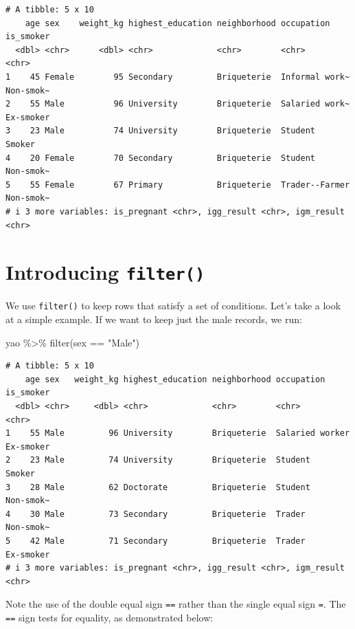 \documentclass[
  letterpaper,
  DIV=11,
  numbers=noendperiod]{scrreprt}
\newenvironment{Shaded}{\begin{snugshade}}{\end{snugshade}}
\newcommand{\FunctionTok}[1]{\textcolor[rgb]{0.28,0.35,0.67}{#1}}
\newcommand{\NormalTok}[1]{\textcolor[rgb]{0.00,0.23,0.31}{#1}}
\newcommand{\SpecialCharTok}[1]{\textcolor[rgb]{0.37,0.37,0.37}{#1}}
\newcommand{\StringTok}[1]{\textcolor[rgb]{0.13,0.47,0.30}{#1}}
\begin{document}
\begin{verbatim}
# A tibble: 5 x 10
    age sex    weight_kg highest_education neighborhood occupation     is_smoker
  <dbl> <chr>      <dbl> <chr>             <chr>        <chr>          <chr>    
1    45 Female        95 Secondary         Briqueterie  Informal work~ Non-smok~
2    55 Male          96 University        Briqueterie  Salaried work~ Ex-smoker
3    23 Male          74 University        Briqueterie  Student        Smoker   
4    20 Female        70 Secondary         Briqueterie  Student        Non-smok~
5    55 Female        67 Primary           Briqueterie  Trader--Farmer Non-smok~
# i 3 more variables: is_pregnant <chr>, igg_result <chr>, igm_result <chr>
\end{verbatim}

\section{\texorpdfstring{Introducing
\texttt{filter()}}{Introducing filter()}}\label{introducing-filter}

We use \texttt{filter()} to keep rows that satisfy a set of conditions.
Let's take a look at a simple example. If we want to keep just the male
records, we run:

\begin{Shaded}
\begin{Highlighting}[]
\NormalTok{yao }\SpecialCharTok{\%\textgreater{}\%} \FunctionTok{filter}\NormalTok{(sex }\SpecialCharTok{==} \StringTok{"Male"}\NormalTok{)}
\end{Highlighting}
\end{Shaded}

\begin{verbatim}
# A tibble: 5 x 10
    age sex   weight_kg highest_education neighborhood occupation      is_smoker
  <dbl> <chr>     <dbl> <chr>             <chr>        <chr>           <chr>    
1    55 Male         96 University        Briqueterie  Salaried worker Ex-smoker
2    23 Male         74 University        Briqueterie  Student         Smoker   
3    28 Male         62 Doctorate         Briqueterie  Student         Non-smok~
4    30 Male         73 Secondary         Briqueterie  Trader          Non-smok~
5    42 Male         71 Secondary         Briqueterie  Trader          Ex-smoker
# i 3 more variables: is_pregnant <chr>, igg_result <chr>, igm_result <chr>
\end{verbatim}

Note the use of the double equal sign \texttt{==} rather than the single
equal sign \texttt{=}. The \texttt{==} sign tests for equality, as
demonstrated below:
\end{document}
